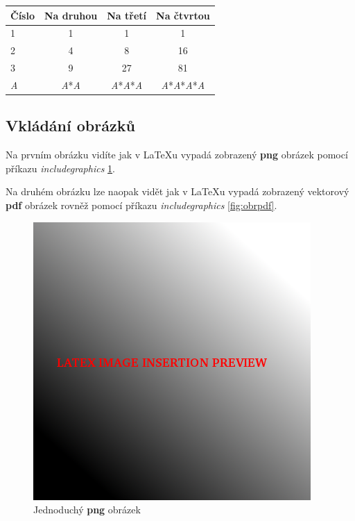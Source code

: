 \documentclass[a4paper,11pt]{article}
\begin{document}
\begin{center}
  \begin{tabular}{| l || c | c | c |}
    \hline
    Číslo & Na druhou & Na třetí & Na čtvrtou \\ \hline \hline
    1 & 1 & 1 & 1 \\ \hline
    2 & 4 & 8 & 16 \\ \hline
    3 & 9 & 27 & 81 \\ \hline
    \textit{A} & \textit{A}*\textit{A} & \textit{A}*\textit{A}*\textit{A} & \textit{A}*\textit{A}*\textit{A}*\textit{A} \\
    \hline
  \end{tabular}
\end{center}

\subsection{Vkládání obrázků}

Na prvním obrázku vidíte jak v LaTeXu vypadá zobrazený \textbf{png} obrázek pomocí příkazu \textit{includegraphics} \ref{fig:obrpng}.

Na druhém obrázku lze naopak vidět jak v LaTeXu vypadá zobrazený vektorový \textbf{pdf} obrázek rovněž pomocí příkazu \textit{includegraphics} \ref{fig:obrpdf}.

\begin{figure}
\centering
\includegraphics[scale=0.4,natwidth=400,natheight=400]{preview.png}
\caption{Jednoduchý \textbf{png} obrázek}
\label{fig:obrpng}
\end{figure}
\end{document}

